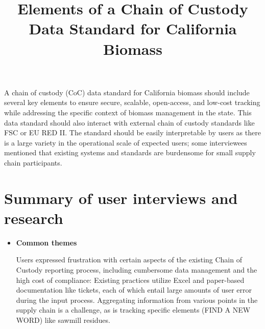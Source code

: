 \documentclass{article}
\title{Elements of a Chain of Custody Data Standard for California Biomass}
\date{}
\begin{document}
\maketitle

A chain of custody (CoC) data standard for California biomass should include several key elements to ensure secure, scalable, open-access, and low-cost tracking while addressing the specific context of biomass management in the state. This data standard should also interact with external chain of custody standards like FSC or EU RED II. The standard should be easily interpretable by users as there is a large variety in the operational scale of expected users; some interviewees mentioned that existing systems and standards are burdensome for small supply chain participants. 


\section{Summary of user interviews and research}
\begin{itemize}
    \item \textbf{Common themes} \begin{enumerate} 
    Users expressed frustration with certain aspects of the existing Chain of Custody reporting process, including cumbersome data management and the high cost of compliance: 
    \subitem Existing practices utilize Excel and paper-based documentation like tickets, each of which entail large amounts of user error during the input process. 
    \subitem Aggregating information from various points in the supply chain is a challenge, as is tracking specific elements (FIND A NEW WORD) like sawmill residues. 
    \subitem 
    \end{enumerate}
    
    
\end{itemize}
\end{document}
